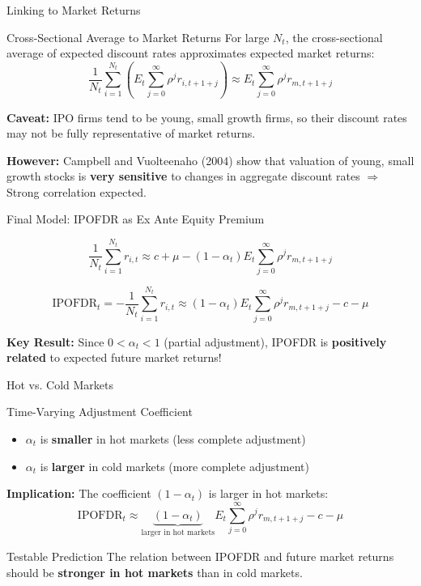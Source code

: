 \documentclass{beamer}
\begin{document}
\begin{frame}{Linking to Market Returns}
\begin{block}{Cross-Sectional Average to Market Returns}
For large $N_t$, the cross-sectional average of expected discount rates approximates expected market returns:
\[
\frac{1}{N_t}\sum_{i=1}^{N_t}\left(E_t\sum_{j=0}^{\infty}\rho^j r_{i,t+1+j}\right) \approx E_t\sum_{j=0}^{\infty}\rho^j r_{m,t+1+j}
\]
\end{block}


\textbf{Caveat:} IPO firms tend to be young, small growth firms, so their discount rates may not be fully representative of market returns.


\textbf{However:} Campbell and Vuolteenaho (2004) show that valuation of young, small growth stocks is \textbf{very sensitive} to changes in aggregate discount rates $\Rightarrow$ Strong correlation expected.
\end{frame}

\begin{frame}{Final Model: IPOFDR as Ex Ante Equity Premium}

\[
\frac{1}{N_t}\sum_{i=1}^{N_t}r_{i,t} \approx c + \mu - (1-\alpha_t)E_t\sum_{j=0}^{\infty}\rho^j r_{m,t+1+j}
\]

\[
\boxed{\text{IPOFDR}_t = -\frac{1}{N_t}\sum_{i=1}^{N_t}r_{i,t} \approx (1-\alpha_t)E_t\sum_{j=0}^{\infty}\rho^j r_{m,t+1+j} - c - \mu}
\]

\textbf{Key Result:} Since $0 < \alpha_t < 1$ (partial adjustment), IPOFDR is \textbf{positively related} to expected future market returns!
\end{frame}

\begin{frame}{Hot vs. Cold Markets}
\begin{block}{Time-Varying Adjustment Coefficient}
\begin{itemize}
    \item $\alpha_t$ is \textbf{smaller} in hot markets (less complete adjustment)
    \item $\alpha_t$ is \textbf{larger} in cold markets (more complete adjustment)
\end{itemize}
\end{block}


\textbf{Implication:} The coefficient $(1-\alpha_t)$ is larger in hot markets:
\[
\text{IPOFDR}_t \approx \underbrace{(1-\alpha_t)}_{\text{larger in hot markets}}E_t\sum_{j=0}^{\infty}\rho^j r_{m,t+1+j} - c - \mu
\]


\begin{alertblock}{Testable Prediction}
The relation between IPOFDR and future market returns should be \textbf{stronger in hot markets} than in cold markets.
\end{alertblock}
\end{frame}
\end{document}
